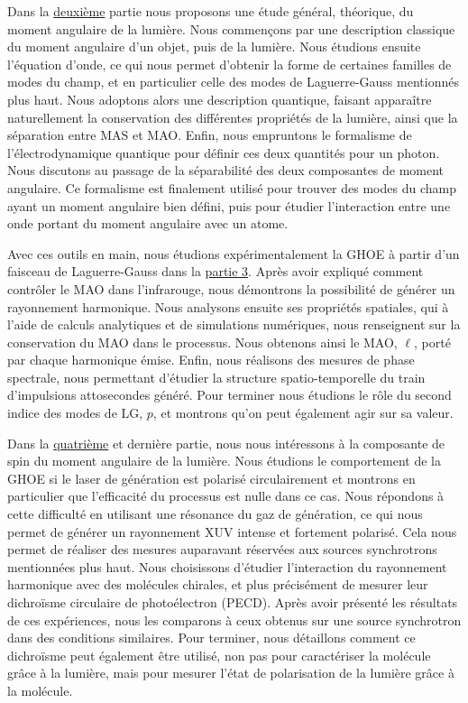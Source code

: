 Dans la \hyperref[PA:LightAM]{deuxième} partie nous proposons une étude général, théorique, du moment angulaire de la lumière. Nous commençons par une description classique du moment angulaire d'un objet, puis de la lumière. Nous étudions ensuite l'équation d'onde, ce qui nous permet d'obtenir la forme de certaines familles de modes du champ, et en particulier celle des modes de Laguerre-Gauss mentionnés plus haut. Nous adoptons alors une description quantique, faisant apparaître naturellement la conservation des différentes propriétés de la lumière, ainsi que la séparation entre MAS et MAO. Enfin, nous empruntons le formalisme de l'électrodynamique quantique pour définir ces deux quantités pour un photon. Nous discutons au passage de la séparabilité des deux composantes de moment angulaire. Ce formalisme est finalement utilisé pour trouver des modes du champ ayant un moment angulaire bien défini, puis pour étudier l'interaction entre une onde portant du moment angulaire avec un atome.

Avec ces outils en main, nous étudions expérimentalement la GHOE à partir d'un faisceau de Laguerre-Gauss dans la \hyperref[PA:OAM_HHG]{partie 3}. Après avoir expliqué comment contrôler le MAO dans l'infrarouge, nous démontrons la possibilité de générer un rayonnement harmonique. Nous analysons ensuite ses propriétés spatiales, qui à l'aide de calculs analytiques et de simulations numériques, nous renseignent sur la conservation du MAO dans le processus. Nous obtenons ainsi le MAO, $\ell$, porté par chaque harmonique émise. Enfin, nous réalisons des mesures de phase spectrale, nous permettant d'étudier la structure spatio-temporelle du train d'impulsions attosecondes généré. Pour terminer nous étudions le rôle du second indice des modes de LG, $p$, et montrons qu'on peut également agir sur sa valeur.

Dans la \hyperref[PA:Spin_HHG]{quatrième} et dernière partie, nous nous intéressons à la composante de spin du moment angulaire de la lumière. Nous étudions le comportement de la GHOE si le laser de génération est polarisé circulairement et montrons en particulier que l'efficacité du processus est nulle dans ce cas. Nous répondons à cette difficulté en utilisant une résonance du gaz de génération, ce qui nous permet de générer un rayonnement XUV intense et fortement polarisé. Cela nous permet de réaliser des mesures auparavant réservées aux sources synchrotrons mentionnées plus haut. Nous choisissons d'étudier l'interaction du rayonnement harmonique avec des molécules chirales, et plus précisément de mesurer leur dichroïsme circulaire de photoélectron (PECD). Après avoir présenté les résultats de ces expériences, nous les comparons à ceux obtenus sur une source synchrotron dans des conditions similaires. Pour terminer, nous détaillons comment ce dichroïsme peut également être utilisé, non pas pour caractériser la molécule grâce à la lumière, mais pour mesurer l'état de polarisation de la lumière grâce à la molécule.

